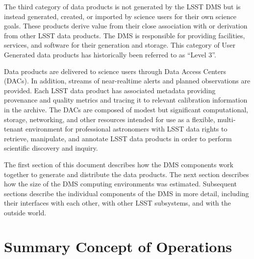 \documentclass[DM,toc,lsstdraft]{lsstdoc}
\begin{document}
The third category of data products is not generated by the LSST DMS but is
instead generated, created, or imported by science users for their own science
goals. These products derive value from their close association with or
derivation from other LSST data products. The DMS is responsible for providing
facilities, services, and software for their generation and storage.  This
category of User Generated data products has historically been referred to as ``Level 3''.

Data products are delivered to science users through Data Access
Centers (DACs). In addition, streams of near-realtime alerts and planned
observations are provided.  Each LSST data product has associated
metadata providing provenance and quality metrics and tracing it to relevant
calibration information in the archive. The DACs are composed of modest but
significant computational, storage, networking, and other resources intended
for use as a flexible, multi-tenant environment for professional astronomers
with LSST data rights to retrieve, manipulate, and annotate LSST data products
in order to perform scientific discovery and inquiry.

The first section of this document describes how the DMS components work
together to generate and distribute the data products.  The next section
describes how the size of the DMS computing environments was estimated.
Subsequent sections describe the individual components of the DMS in more
detail, including their interfaces with each other, with other LSST subsystems,
and with the outside world.

\section{Summary Concept of Operations}\label{summary-concept-of-operations}
\end{document}
